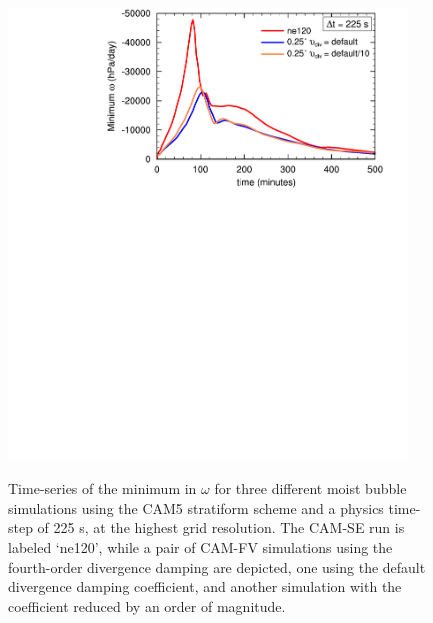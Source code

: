 \begin{figure}
\begin{center}
\noindent\includegraphics[width=25pc,angle=0]{chapter3/Figure8_crop.pdf}\\
\end{center}
\caption{Time-series of the minimum in $\omega$ for three different moist bubble simulations using the CAM5 stratiform scheme and a physics time-step of 225 s, at the highest grid resolution. The CAM-SE run is labeled `ne120’, while a pair of CAM-FV simulations using the fourth-order divergence damping are depicted, one using the default divergence damping coefficient, and another simulation with the coefficient reduced by an order of magnitude.}
\label{fig:figure3-8}
\end{figure}

